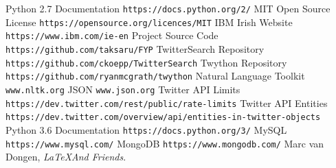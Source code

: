 \documentclass[12pt,a4paper]{report}
\begin{document}
\begin{thebibliography}{14}
Python 2.7 Documentation
\texttt{https://docs.python.org/2/}
MIT Open Source License
\texttt{https://opensource.org/licences/MIT}
IBM Irish Website
\texttt{https://www.ibm.com/ie-en}
Project Source Code
\texttt{https://github.com/taksaru/FYP}
TwitterSearch Repository
\texttt{https://github.com/ckoepp/TwitterSearch}
Twython Repository
\texttt{https://github.com/ryanmcgrath/twython}
Natural Language Toolkit
\texttt{www.nltk.org}
JSON 
\texttt{www.json.org}
Twitter API Limits
\texttt{https://dev.twitter.com/rest/public/rate-limits}
Twitter API Entities
\texttt{https://dev.twitter.com/overview/api/entities-in-twitter-objects}
Python 3.6 Documentation
\texttt{https://docs.python.org/3/}
MySQL 
\texttt{https://www.mysql.com/}
MongoDB
\texttt{https://www.mongodb.com/}
Marc van Dongen, 
\textit{\LaTeX And Friends}.
\end{thebibliography}
\end{document}
